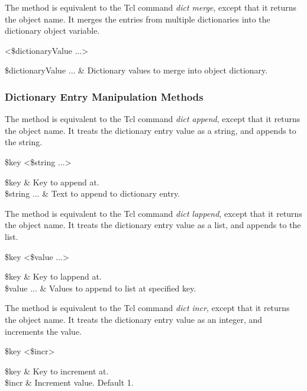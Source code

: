 \documentclass{article}
\begin{document}
The method  is equivalent to the Tcl command \textit{dict merge}, except that it returns the object name.
It merges the entries from multiple dictionaries into the dictionary object variable. 
\begin{syntax}
 <\$dictionaryValue ...>
\end{syntax}
\begin{args}
\$dictionaryValue ... & Dictionary values to merge into object dictionary. 
\end{args}
\clearpage
\subsubsection{Dictionary Entry Manipulation Methods}

The method  is equivalent to the Tcl command \textit{dict append}, except that it returns the object name.
It treats the dictionary entry value as a string, and appends to the string. 
\begin{syntax}
 \$key <\$string ...>
\end{syntax}
\begin{args}
\$key & Key to append at. \\
\$string ... & Text to append to dictionary entry.
\end{args}

The method  is equivalent to the Tcl command \textit{dict lappend}, except that it returns the object name.
It treats the dictionary entry value as a list, and appends to the list.
\begin{syntax}
 \$key <\$value ...>
\end{syntax}
\begin{args}
\$key & Key to lappend at. \\
\$value ... & Values to append to list at specified key.
\end{args}

The method  is equivalent to the Tcl command \textit{dict incr}, except that it returns the object name.
It treats the dictionary entry value as an integer, and increments the value.
\begin{syntax}
 \$key <\$incr>
\end{syntax}
\begin{args}
\$key & Key to increment at. \\
\$incr & Increment value. Default 1.
\end{args}
\end{document}
